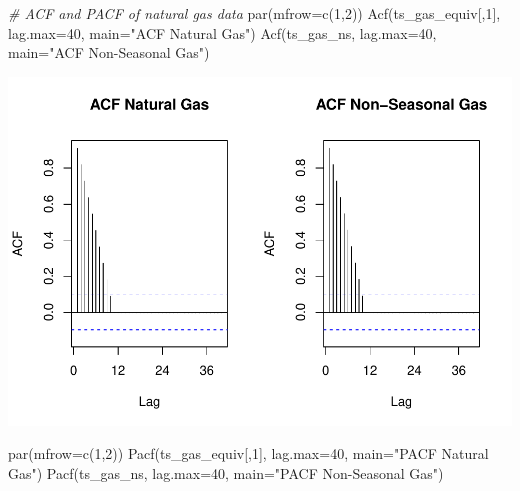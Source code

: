 \documentclass[
]{article}
\newenvironment{Shaded}{\begin{snugshade}}{\end{snugshade}}
\newcommand{\AttributeTok}[1]{\textcolor[rgb]{0.77,0.63,0.00}{#1}}
\newcommand{\CommentTok}[1]{\textcolor[rgb]{0.56,0.35,0.01}{\textit{#1}}}
\newcommand{\DecValTok}[1]{\textcolor[rgb]{0.00,0.00,0.81}{#1}}
\newcommand{\FunctionTok}[1]{\textcolor[rgb]{0.00,0.00,0.00}{#1}}
\newcommand{\NormalTok}[1]{#1}
\newcommand{\StringTok}[1]{\textcolor[rgb]{0.31,0.60,0.02}{#1}}
\begin{document}
\begin{Shaded}
\begin{Highlighting}[]
\CommentTok{\# ACF and PACF of natural gas data}
\FunctionTok{par}\NormalTok{(}\AttributeTok{mfrow=}\FunctionTok{c}\NormalTok{(}\DecValTok{1}\NormalTok{,}\DecValTok{2}\NormalTok{))}
\FunctionTok{Acf}\NormalTok{(ts\_gas\_equiv[,}\DecValTok{1}\NormalTok{], }\AttributeTok{lag.max=}\DecValTok{40}\NormalTok{, }\AttributeTok{main=}\StringTok{"ACF Natural Gas"}\NormalTok{)}
\FunctionTok{Acf}\NormalTok{(ts\_gas\_ns, }\AttributeTok{lag.max=}\DecValTok{40}\NormalTok{, }\AttributeTok{main=}\StringTok{"ACF Non{-}Seasonal Gas"}\NormalTok{)}
\end{Highlighting}
\end{Shaded}

\includegraphics{Final-Project_files/figure-latex/unnamed-chunk-6-3.pdf}

\begin{Shaded}
\begin{Highlighting}[]
\FunctionTok{par}\NormalTok{(}\AttributeTok{mfrow=}\FunctionTok{c}\NormalTok{(}\DecValTok{1}\NormalTok{,}\DecValTok{2}\NormalTok{))}
\FunctionTok{Pacf}\NormalTok{(ts\_gas\_equiv[,}\DecValTok{1}\NormalTok{], }\AttributeTok{lag.max=}\DecValTok{40}\NormalTok{, }\AttributeTok{main=}\StringTok{"PACF Natural Gas"}\NormalTok{)}
\FunctionTok{Pacf}\NormalTok{(ts\_gas\_ns, }\AttributeTok{lag.max=}\DecValTok{40}\NormalTok{, }\AttributeTok{main=}\StringTok{"PACF Non{-}Seasonal Gas"}\NormalTok{)}
\end{Highlighting}
\end{Shaded}
\end{document}
